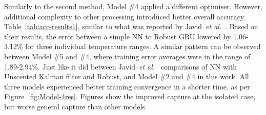 %
%
Similarly to the second method, Model \#4 applied a different optimiser.
However, additional complexity to other processing introduced better overall accuracy \mbox{Table~\ref{tab:acc-results1}}, similar to what was reported by Javid~\textit{et al.}~\cite{javid_adaptive_2020}.
Based on their results, the error between a simple NN to Robust GRU lowered by 1.06-3.12\% for three individual temperature ranges.
A similar pattern can be observed between Model \#5 and \#4, where training error averages were in the range of 1.89-2.94\%.
Just like it did between Javid~\textit{et al.}~\cite{javid_adaptive_2020} comparisons of NN with Unscented Kalman filter and Robust, and Model \#2 and \#4 in this work.
All three models experienced better training convergence in a shorter time, as per Figure~\ref{fig:Model-4res}.
Figures show the improved capture at the isolated case, but worse general capture than other models.

